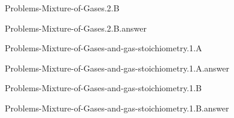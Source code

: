 \documentclass[main.tex]{subfiles}
\newcommand\chapterlabel{}
\begin{document}
\renewcommand\chapterlabel{Ch-Gas}
\begin{question}[ID=\the\value{numA}]
{Problems-Mixture-of-Gases.2.B}
\end{question}
   \begin{Form}
   \TextField[multiline,backgroundcolor=gray!20,borderwidth=0,width=0.43\textwidth  ,height=115pt, name=\the\value{numA}]  { }\end{Form}
\begin{solution}
{Problems-Mixture-of-Gases.2.B.answer}
\hspace{0.1cm}
\end{solution}


\renewcommand\chapterlabel{Ch-Gas}
\begin{question}[ID=\the\value{numA}]
{Problems-Mixture-of-Gases-and-gas-stoichiometry.1.A}
\end{question}
   \begin{Form}
   \TextField[multiline,backgroundcolor=gray!20,borderwidth=0,width=0.43\textwidth  ,height=115pt, name=\the\value{numA}]  { }\end{Form}
\begin{solution}
{Problems-Mixture-of-Gases-and-gas-stoichiometry.1.A.answer}
\hspace{0.1cm}
\end{solution}


\renewcommand\chapterlabel{Ch-Gas}
\begin{question}[ID=\the\value{numA}]
{Problems-Mixture-of-Gases-and-gas-stoichiometry.1.B}
\end{question}
   \begin{Form}
   \TextField[multiline,backgroundcolor=gray!20,borderwidth=0,width=0.43\textwidth  ,height=115pt, name=\the\value{numA}]  { }\end{Form}
\begin{solution}
{Problems-Mixture-of-Gases-and-gas-stoichiometry.1.B.answer}
\hspace{0.1cm}
\end{solution}
\end{document}
